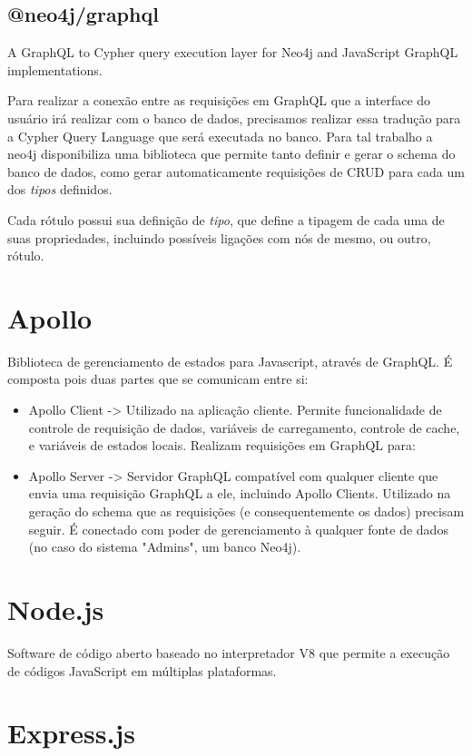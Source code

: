 \subsection{@neo4j/graphql}
A GraphQL to Cypher query execution layer for Neo4j and JavaScript GraphQL implementations.

Para realizar a conexão entre as requisições em GraphQL que a interface do usuário irá realizar com o banco de dados, precisamos realizar essa tradução para a Cypher Query Language que será executada no banco. Para tal trabalho a neo4j disponibiliza uma biblioteca que permite tanto definir e gerar o schema do banco de dados, como gerar automaticamente requisições de CRUD para cada um dos \textit{tipos} definidos.

Cada rótulo possui sua definição de \textit{tipo}, que define a tipagem de cada uma de suas propriedades, incluindo possíveis ligações com nós de mesmo, ou outro, rótulo.

\section{Apollo}

Biblioteca de gerenciamento de estados para Javascript, através de GraphQL. É composta pois duas partes que se comunicam entre si:
\begin{itemize}
    \item Apollo Client -> Utilizado na aplicação cliente. Permite funcionalidade de controle de requisição de dados, variáveis de carregamento, controle de cache, e variáveis de estados locais. Realizam requisições em GraphQL para:
    \item Apollo Server -> Servidor GraphQL compatível com qualquer cliente que envia uma requisição GraphQL a ele, incluindo Apollo Clients. Utilizado na geração do schema que as requisições (e consequentemente os dados) precisam seguir. É conectado com poder de gerenciamento à qualquer fonte de dados (no caso do sistema "Admins", um banco Neo4j).

\end{itemize}

\section{Node.js}

Software de código aberto baseado no interpretador V8 que permite a execução de códigos JavaScript em múltiplas plataformas.

\section{Express.js}

